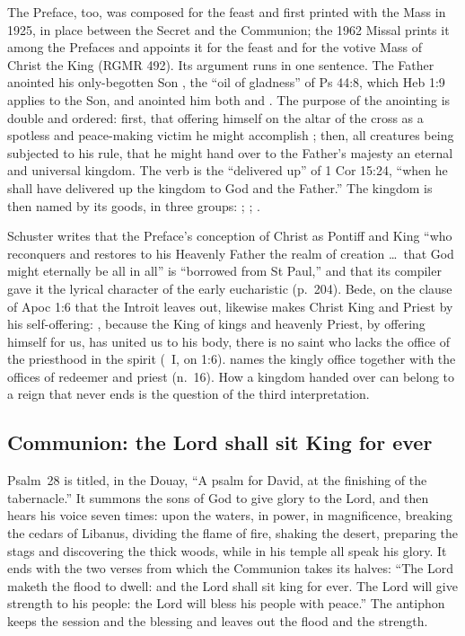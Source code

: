 The Preface, too, was composed for the feast and first printed with the Mass
in 1925, in place between the Secret and the Communion; the 1962 Missal prints
it among the Prefaces and appoints it for the feast and for the votive Mass of
Christ the King (RGMR 492). Its argument runs in one sentence. The Father
anointed his only-begotten Son , the ``oil of
gladness'' of Ps 44:8, which Heb 1:9 applies to the Son, and anointed him
both  and . The purpose of
the anointing is double and ordered: first, that offering himself on the altar
of the cross as a spotless and peace-making victim he might accomplish
; then, all creatures being subjected
to his rule, that he might hand over to the Father's majesty an eternal and
universal kingdom. The verb  is the ``delivered up'' of 1 Cor
15:24, ``when he shall have delivered up the kingdom to God and the Father.''
The kingdom is then named by its goods, in three groups: ; ; .

Schuster writes that the Preface's conception of Christ as Pontiff and King
``who reconquers and restores to his Heavenly Father the realm of creation
\dots\ that God might eternally be all in all'' is ``borrowed from St Paul,''
and that its compiler gave it the lyrical character of the early eucharistic  (p.~204). Bede, on
the clause of Apoc 1:6 that the Introit leaves out, likewise makes Christ King
and Priest by his self-offering: , because the King of kings and
heavenly Priest, by offering himself for us, has united us to his body, there
is no saint who lacks the office of the priesthood in the spirit (\ I, on 1:6).  names the kingly office together with
the offices of redeemer and priest (n.~16). How a kingdom handed over can belong to a reign that never ends is
the question of the third interpretation.

\subsection{Communion: the Lord shall sit King for ever}
\label{sec:element-communion}

Psalm~28 is titled, in the Douay, ``A psalm for David, at the finishing of the
tabernacle.'' It summons the sons of God to give glory to the Lord, and then
hears his voice seven times: upon the waters, in power, in magnificence,
breaking the cedars of Libanus, dividing the flame of fire, shaking the
desert, preparing the stags and discovering the thick woods, while in his
temple all speak his glory. It ends with the two verses from which the
Communion takes its halves: ``The Lord maketh the flood to dwell: and the Lord
shall sit king for ever. The Lord will give strength to his people: the Lord
will bless his people with peace.'' The antiphon keeps the session and the
blessing and leaves out the flood and the strength.

